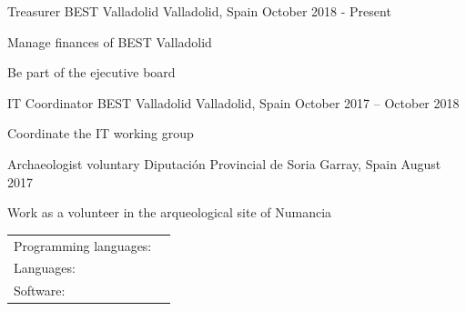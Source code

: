 \documentclass[]{awesome-cv}
\begin{document}
\vspace{-2mm}
\begin{cventries}
	\cventry
	{Treasurer}
	{BEST Valladolid}
	{Valladolid, Spain}
	{October 2018 - Present}
	{\begin{cvitems}
		\item {Manage finances of BEST Valladolid}
		\item {Be part of the ejecutive board}
		\end{cvitems}}
	\cventry
	{IT Coordinator}
	{BEST Valladolid}
	{Valladolid, Spain}
	{October 2017 – October 2018}
	{\begin{cvitems}
		\item {Coordinate the IT working group}
		\end{cvitems}}
	\cventry
	{Archaeologist voluntary}
	{Diputación Provincial de Soria}
	{Garray, Spain}
	{August 2017}
	{\begin{cvitems}
		\item {Work as a volunteer in the arqueological site of Numancia}
		\end{cvitems}}
\end{cventries}
\begin{cventries}
	\cventry
	{}
	{\def\arraystretch{1.15}{\begin{tabular}{ l l }
		Programming languages:  & {\skill{ Rust, C, Python, C\#, Java, JavaScript, TypeScript}} \\
		Languages:  & {\skill{ Spanish (native), English ( FIRST B2)}} \\
		Software: & {\skill{GNU/Linux, Windows, \LaTeX , PostgreSQL, MongoDB, Microsoft Office, Git, Inkscape}} \\
		\end{tabular}}}
	{}
	{}
	{}
\end{cventries}
\end{document}
